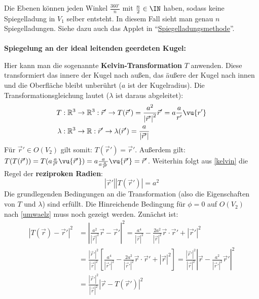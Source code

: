 		  Die Ebenen können jeden Winkel $\frac{360^\circ}{n}$ mit $\frac{n}{2}\in\IN$ haben, sodass keine Spiegelladung in $V_1$ selber entsteht. In diesem Fall sieht man genau $n$ Spiegelladungen. Siehe dazu auch das Applet in \enquote{\href{https://bildungsportal.sachsen.de/opal/auth/RepositoryEntry/27455913992/CourseNode/103138906469436/Theoretische\%20Elektrotechnik/Vertiefung/Spiegelladungsmethode}{Spiegelladungsmethode}}.\\\\
		  \textbf{Spiegelung an der ideal leitenden geerdeten Kugel:}
		  \begin{center}
		  	
		  \end{center}
		  	 Hier kann man die sogenannte \textbf{Kelvin-Transformation} $T$ anwenden. Diese transformiert das innere der Kugel nach außen, das äußere der Kugel nach innen und die Oberfläche bleibt unberührt ($a$ ist der Kugelradius). Die Transformationsgleichung lautet ($\lambda$ ist daraus abgeleitet):
		  	\begin{equation}\label{kelvin}\begin{split}
		  			T & :  \mathbb{R}^3 \to \mathbb{R}^3 : \vec{r}'  \to T(\vec{r}' ) = \frac{a^2}{\left| \vec{r}' \right|^2} \vec{r}'  = a \frac{a}{ r'} \vu{ r'}\\
		  			\lambda & :  \mathbb{R}^3 \to \mathbb{R} : \vec{r}'  \to \lambda(\vec{r}' ) = \frac{a}{\left| \vec{r}' \right|}
		  	\end{split}\end{equation}
		  	 Für $\vec{r}'  \in O(V_2)$ gilt somit: $T(\vec{r}' ) = \vec{r}' $. Außerdem gilt: $T(T(\vec{r}' )) = T(a \frac{a}{{\vec{r}'} } \vu{{\vec{r}' }})=  a \frac{a}{a \frac{a}{\vec{r}' }} \vu{{\vec{r}' }} = \vec{r}' $. Weiterhin folgt aus \ref{kelvin} die Regel der \textbf{reziproken Radien}:
		  	\begin{equation}
		  		\boxed{\left| \vec{r}'  \right| \left| T(\vec{r}' ) \right| = a^2}
		  	\end{equation}
		  	 Die grundlegenden Bedingungen an die Transformation (also die Eigenschaften von $T$ und $\lambda$) sind erfüllt. Die Hinreichende Bedingung für $\phi = 0$ auf $O(V_2)$ nach \ref{umwaelz} muss noch gezeigt werden. Zunächst ist:
		  	\begin{equation}\label{eigKelvin}\begin{split}
		  			\left| T(\vec{r} ) - \vec{r}'   \right|^2 & = \left| \frac{a^2}{\left| \vec{r} \right|^2} \vec{r}  - \vec{r}'  \right|^2 = \frac{a^4}{\left| \vec{r} \right|^2} - \frac{2a^2}{\left| \vec{r} \right|^2} \vec{r}  \cdot \vec{r}'  + \left| \vec{r}' \right|^2 \\
		  			& = \frac{\left| \vec{r}' \right|^2}{\left| \vec{r} \right|^2} \left[  \frac{a^4}{\left| \vec{r}' \right|^2} - \frac{2a^2}{\left| \vec{r}' \right|^2} \vec{r}  \cdot \vec{r}'  + \left| \vec{r} \right|^2 \right] = \frac{\left| \vec{r}' \right|^2}{\left| \vec{r} \right|^2} \left| \vec{r}  - \frac{a^2}{\left| \vec{r}' \right|^2} \vec{r}' \right|^2\\
		  			& = \frac{\left| \vec{r}' \right|^2}{\left| \vec{r} \right|^2} \left| \vec{r}    - T(\vec{r}' ) \right|^2
		  	\end{split}\end{equation}
